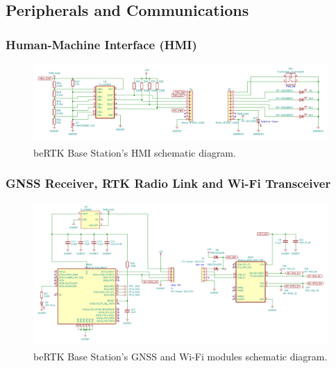 \subsection{Peripherals and Communications}\label{sec:323_PERIPHERALS_COMMS}

\subsubsection{Human-Machine Interface (HMI)}\label{sec:3231_BACKPANEL}

\begin{figure}[h]
	\centering
	\includegraphics[width=1.0\textwidth]{Chapters/Figures/chapter3/Back_Panel.pdf}
	\caption{beRTK\textsuperscript{\textregistered} Base Station's HMI schematic diagram.}
	\label{fig:HMI_circuit}
\end{figure}


\subsubsection{GNSS Receiver, RTK Radio Link and Wi-Fi Transceiver}\label{sec:3232_ZEDF9P_XBEE3}

\begin{figure}[h]
	\centering
	\includegraphics[width=1.0\textwidth]{Chapters/Figures/chapter3/Modules_ZEDF9P_XBEE3.pdf}
	\caption{beRTK\textsuperscript{\textregistered} Base Station's GNSS and Wi-Fi modules schematic diagram.}
	\label{fig:ZEDF9P_XBEE3_circuit}
\end{figure}

